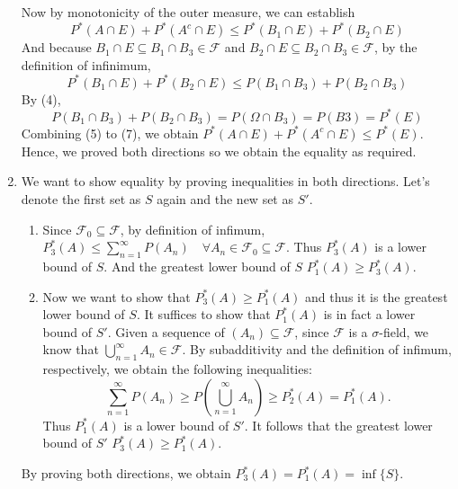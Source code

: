 \documentclass[12pt]{article}
\begin{document}
\begin{problem}[5]
\begin{enumerate}[label=\alph*)]
		Now by monotonicity of the outer measure, we can establish
	\begin{equation}
		P^* (A \cap E) + P^* (A^{c} \cap E) \leq P^* (B_1 \cap E) + P^* (B_2 \cap  E)
	\end{equation}
	And because $B_1 \cap E \subseteq B_1 \cap B_3 \in \mathcal{F}$ and $B_2 \cap E \subseteq B_2 \cap B_3 \in \mathcal{F}$, by the definition of infinimum, 
	\begin{equation}
		P^* (B_1 \cap E) + P^* (B_2 \cap E) \leq P(B_1 \cap B_3) + P(B_2 \cap B_3)
	\end{equation}
	By (4),
	\begin{equation}
		P(B_1 \cap B_3) + P(B_2 \cap B_3) = P(\Omega \cap B_3) = P(B3) = P^* (E)
	\end{equation}
	Combining (5) to (7), we obtain $P^* (A \cap E) + P^* (A^{c} \cap E) \leq P^* (E)$. Hence, we proved both directions so we obtain the equality as required.
\item We want to show equality by proving inequalities in both directions. Let's denote the first set as $S$ again and the new set as $S'$.
	\begin{enumerate}[label=\arabic*)]
		\item Since $\mathcal{F}_0 \subseteq \mathcal{F}$, by definition of infimum, $P_3^* (A) \leq \sum_{ n=1}^{\infty} P(A_n) \quad \forall A_n \in \mathcal{F}_0 \subseteq \mathcal{F}$. Thus $P_3^* (A)$ is a lower bound of $S$. And the greatest lower bound of $S$ $P_1^* (A) \geq P_3^* (A)$.
		\item Now we want to show that  $P_3^* (A) \geq P_1^* (A)$ and thus it is the greatest lower bound of $S$. It suffices to show that  $P_1^* (A)$ is in fact a lower bound of $S'$. Given a sequence of  $(A_n) \subseteq \mathcal{F}$, since $\mathcal{F}$ is a $\sigma$-field, we know that $\bigcup_{ n =1}^{\infty} A_n \in \mathcal{F} $. By subadditivity and the definition of infimum, respectively, we obtain the following inequalities:
\[
	\sum_{ n=1}^{\infty} P(A_n) \geq P\left( \bigcup_{n =1}^{\infty} A_n \right) \geq P_2^* (A) = P_1^* (A)
.\]
Thus $P_1^* (A)$ is a lower bound of $S'$. It follows that the greatest lower bound of $S'$ $P_3^* (A) \geq P_1^* (A)$.  
	\end{enumerate}
	By proving both directions, we obtain $P_3^*(A) = P_1^* (A) = \inf\{S\}$.
\end{enumerate}
\end{problem}
\end{document}

